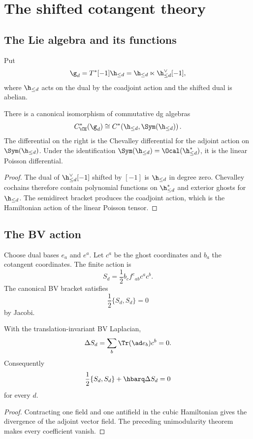 \chapter{The shifted cotangent theory}
\section{The Lie algebra and its functions}
Put
\[
 \g_d=T^*[-1]\h_{\le d}
 =\h_{\le d}\ltimes\h_{\le d}^\vee[-1],
\]
where $\h_{\le d}$ acts on the dual by the coadjoint action and the shifted dual is abelian.

\begin{proposition}
There is a canonical isomorphism of commutative dg algebras
\[
 C^*_{\CE}(\g_d)
 \cong
 C^*\!\left(\h_{\le d},\Sym(\h_{\le d})\right).
\]
The differential on the right is the Chevalley differential for the adjoint action on $\Sym(\h_{\le d})$.  Under the identification $\Sym(\h_{\le d})=\Ocal(\h_{\le d}^*)$, it is the linear Poisson differential.
\end{proposition}
\begin{proof}
The dual of $\h_{\le d}^\vee[-1]$ shifted by $[-1]$ is $\h_{\le d}$ in degree zero.  Chevalley cochains therefore contain polynomial functions on $\h_{\le d}^*$ and exterior ghosts for $\h_{\le d}$.  The semidirect bracket produces the coadjoint action, which is the Hamiltonian action of the linear Poisson tensor.
\end{proof}

\section{The BV action}
Choose dual bases $e_a$ and $e^a$.  Let $c^a$ be the ghost coordinates and $b_a$ the cotangent coordinates.  The finite action is
\[
 S_d=\frac12 b_c f^c{}_{ab}c^ac^b.
\]
The canonical BV bracket satisfies
\[
 \frac12\{S_d,S_d\}=0
\]
by Jacobi.

\begin{theorem}
With the translation-invariant BV Laplacian,
\[
 \Delta S_d=\sum_b\Tr(\ad e_b)c^b=0.
\]
Consequently
\[
 \frac12\{S_d,S_d\}+\hbarq\Delta S_d=0
\]
for every $d$.
\end{theorem}
\begin{proof}
Contracting one field and one antifield in the cubic Hamiltonian gives the divergence of the adjoint vector field.  The preceding unimodularity theorem makes every coefficient vanish.
\end{proof}

